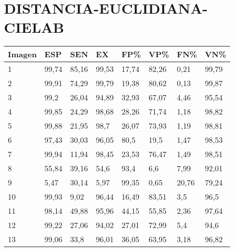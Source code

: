 \section{DISTANCIA-EUCLIDIANA-CIELAB}
\begin{longtable}[c]{|l|l|l|l|l|l|l|l|}
\hline
\textbf{Imagen} & \textbf{ESP} & \textbf{SEN} & \textbf{EX} & \textbf{FP\%} & \textbf{VP\%} & \textbf{FN\%} & \textbf{VN\%} \\ \hline
\endfirsthead
%
\endhead
%
1               & 99,74        & 85,16        & 99,53       & 17,74         & 82,26         & 0,21          & 99,79         \\ \hline
2               & 99,91        & 74,29        & 99,79       & 19,38         & 80,62         & 0,13          & 99,87         \\ \hline
3               & 99,2         & 26,04        & 94,89       & 32,93         & 67,07         & 4,46          & 95,54         \\ \hline
4               & 99,85        & 24,29        & 98,68       & 28,26         & 71,74         & 1,18          & 98,82         \\ \hline
5               & 99,88        & 21,95        & 98,7        & 26,07         & 73,93         & 1,19          & 98,81         \\ \hline
6               & 97,43        & 30,03        & 96,05       & 80,5          & 19,5          & 1,47          & 98,53         \\ \hline
7               & 99,94        & 11,94        & 98,45       & 23,53         & 76,47         & 1,49          & 98,51         \\ \hline
8               & 55,84        & 39,16        & 54,6        & 93,4          & 6,6           & 7,99          & 92,01         \\ \hline
9               & 5,47         & 30,14        & 5,97        & 99,35         & 0,65          & 20,76         & 79,24         \\ \hline
10              & 99,93        & 9,02         & 96,44       & 16,49         & 83,51         & 3,5           & 96,5          \\ \hline
11              & 98,14        & 49,88        & 95,96       & 44,15         & 55,85         & 2,36          & 97,64         \\ \hline
12              & 99,22        & 27,06        & 94,02       & 27,01         & 72,99         & 5,4           & 94,6          \\ \hline
13              & 99,06        & 33,8         & 96,01       & 36,05         & 63,95         & 3,18          & 96,82         \\ \hline

\end{longtable}
